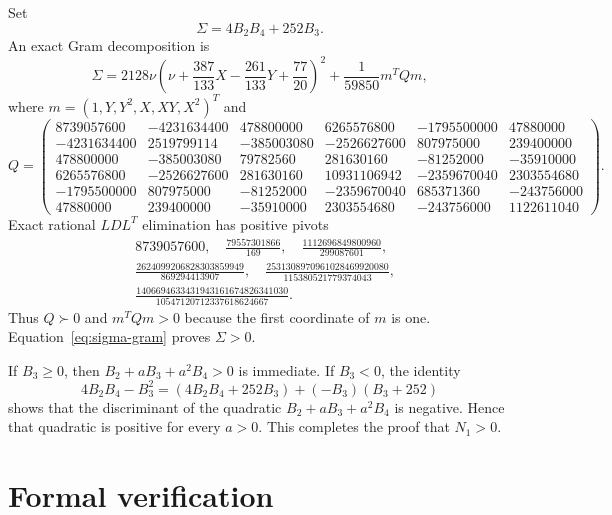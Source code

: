 \documentclass[10pt,twoside]{siamart1116}
\newcommand{\mat}[1]{\begin{pmatrix}#1\end{pmatrix}}
\newcommand{\pd}{\succ 0}
\begin{document}
Set
\[
 \Sigma=4B_2B_4+252B_3.
\]
An exact Gram decomposition is
\begin{equation}\label{eq:sigma-gram}
 \Sigma=2128\nu\left(\nu+\frac{387}{133}X-
 \frac{261}{133}Y+\frac{77}{20}\right)^2
 +\frac1{59850}m^TQm,
\end{equation}
where $m=(1,Y,Y^2,X,XY,X^2)^T$ and
\begingroup
\scriptsize
\[
Q=\mat{
8739057600&-4231634400&478800000&6265576800&-1795500000&47880000\\
-4231634400&2519799114&-385003080&-2526627600&807975000&239400000\\
478800000&-385003080&79782560&281630160&-81252000&-35910000\\
6265576800&-2526627600&281630160&10931106942&-2359670040&2303554680\\
-1795500000&807975000&-81252000&-2359670040&685371360&-243756000\\
47880000&239400000&-35910000&2303554680&-243756000&1122611040
}.
\]
\endgroup
Exact rational $LDL^T$ elimination has positive pivots
\begin{align*}
&8739057600,\quad \frac{79557301866}{169},\quad
\frac{1112696849800960}{299087601},\\
&\frac{2624099206828303859949}{869294413907},\quad
\frac{2531308970961028469920080}{115380521779374043},\\
&\frac{1406694633431943161674826341030}
{10547120712337618624667}.
\end{align*}
Thus $Q\pd$ and $m^TQm>0$ because the first coordinate of $m$ is one.
Equation~\eqref{eq:sigma-gram} proves $\Sigma>0$.

If $B_3\geq0$, then $B_2+aB_3+a^2B_4>0$ is immediate.  If $B_3<0$, the
identity
\[
 4B_2B_4-B_3^2=(4B_2B_4+252B_3)+(-B_3)(B_3+252)
\]
shows that the discriminant of the quadratic
$B_2+aB_3+a^2B_4$ is negative.  Hence that quadratic is positive for every
$a>0$.  This completes the proof that $N_1>0$.

\section{Formal verification}\label{app:formal-verification}
\end{document}
